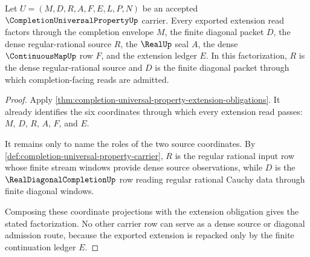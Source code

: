 \begin{theorem}
\label{thm:completion-universal-property-dense-source-factorization}
Let $U=(M,D,R,A,F,E,L,P,N)$ be an accepted $\CompletionUniversalPropertyUp$ carrier. Every exported extension read factors through the completion envelope $M$, the finite diagonal packet $D$, the dense regular-rational source $R$, the $\RealUp$ seal $A$, the dense $\ContinuousMapUp$ row $F$, and the extension ledger $E$. In this factorization, $R$ is the dense regular-rational source and $D$ is the finite diagonal packet through which completion-facing reads are admitted.
\end{theorem}
\begin{proof}
Apply \autoref{thm:completion-universal-property-extension-obligations}. It already identifies the six coordinates through which every extension read passes: $M$, $D$, $R$, $A$, $F$, and $E$.

It remains only to name the roles of the two source coordinates. By \autoref{def:completion-universal-property-carrier}, $R$ is the regular rational input row whose finite stream windows provide dense source observations, while $D$ is the $\RealDiagonalCompletionUp$ row reading regular rational Cauchy data through finite diagonal windows.

Composing these coordinate projections with the extension obligation gives the stated factorization. No other carrier row can serve as a dense source or diagonal admission route, because the exported extension is repacked only by the finite continuation ledger $E$.
\end{proof}


